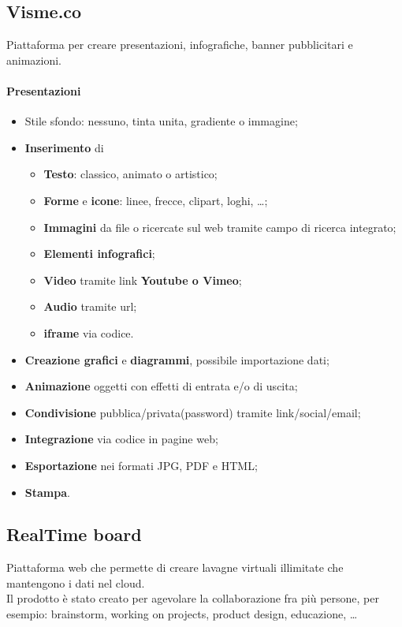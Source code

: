 \subsection{Visme.co}
Piattaforma per creare presentazioni, infografiche, banner pubblicitari e animazioni.
\paragraph{Presentazioni}
\begin{itemize}
 \item Stile sfondo: nessuno, tinta unita, gradiente o immagine;
 \item \textbf{Inserimento} di 
 \begin{itemize}
  \item \textbf{Testo}: classico, animato o artistico;
  \item \textbf{Forme} e \textbf{icone}: linee, frecce, clipart, loghi, \dots;
  \item \textbf{Immagini} da file o ricercate sul web tramite campo di ricerca integrato;
  \item \textbf{Elementi infografici};
  \item \textbf{Video} tramite link \textbf{Youtube o Vimeo};
  \item \textbf{Audio} tramite url;
  \item \textbf{iframe} via codice.
 \end{itemize}
 \item \textbf{Creazione grafici} e \textbf{diagrammi}, possibile importazione dati;
 \item \textbf{Animazione} oggetti con effetti di entrata e/o di uscita;
 \item \textbf{Condivisione} pubblica/privata(password) tramite link/social/email;
 \item \textbf{Integrazione} via codice in pagine web;
 \item \textbf{Esportazione} nei formati JPG, PDF e HTML;
 \item \textbf{Stampa}.
\end{itemize}
\subsection{RealTime board}
Piattaforma web che permette di creare lavagne virtuali illimitate che mantengono i dati nel cloud.\\
Il prodotto è stato creato per agevolare la collaborazione fra più persone, per esempio: brainstorm, working on projects, product design, educazione, \dots

